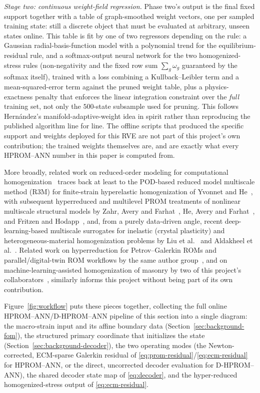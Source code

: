 \documentclass[10pt,a4paper]{article}
\begin{document}
\emph{Stage two: continuous weight-field regression.} Phase two's
output is the final fixed support together with a table of
graph-smoothed weight vectors, one per sampled training state: still
a discrete object that must be evaluated at arbitrary, unseen states
online. This table is fit by one of two regressors depending on the
rule: a Gaussian radial-basis-function model with a polynomial trend
for the equilibrium-residual rule, and a softmax-output neural network
for the two homogenized-stress rules (non-negativity and the fixed row
sum $\sum_g\omega_g$ guaranteed by the softmax itself), trained with a
loss combining a Kullback--Leibler term and a mean-squared-error term
against the pruned weight table, plus a physics-exactness penalty that
enforces the linear integration constraint over the \emph{full}
training set, not only the $500$-state subsample used for pruning. This
follows Hern\'andez's manifold-adaptive-weight idea in spirit rather
than reproducing the published algorithm line for line. The offline
scripts that produced the specific support and weights deployed for
this RVE are not part of this project's own contribution; the trained
weights themselves are, and are exactly what every HPROM--ANN number in
this paper is computed from.

More broadly, related work on reduced-order modeling
for computational
homogenization~\cite{Hernandez2014,Hernandez2020,Miehe1999} traces back
at least to the POD-based reduced model multiscale method (R3M) for
finite-strain hyperelastic homogenization of Yvonnet and
He~\cite{Yvonnet2007}, with subsequent hyperreduced and multilevel PROM
treatments of nonlinear multiscale structural models by Zahr, Avery and
Farhat~\cite{Zahr2017}, He, Avery and Farhat~\cite{He2020}, and Fritzen
and Hodapp~\cite{Fritzen2016}, and, from a purely data-driven angle,
recent deep-learning-based multiscale surrogates for inelastic (crystal
plasticity) and heterogeneous-material homogenization problems by Liu
et al.~\cite{Liu2022} and Aldakheel et al.~\cite{Aldakheel2023}. Related
work on hyperreduction for Petrov--Galerkin ROMs and parallel/digital-twin
ROM workflows by the same author group~\cite{AresDeParga2023,AresDeParga2025},
and on machine-learning-assisted homogenization of masonry by two of
this project's collaborators~\cite{Cornejo2025}, similarly informs this
project without being part of its own contribution.

Figure~\ref{fig:workflow} puts these pieces together, collecting
the full online HPROM--ANN/D-HPROM--ANN pipeline of this section into a
single diagram: the macro-strain input and its affine boundary data
(Section~\ref{sec:background-fom}), the structured primary coordinate that
initializes the state (Section~\ref{sec:background-decoder}), the two
operating modes (the Newton-corrected, ECM-sparse Galerkin residual of
\eqref{eq:prom-residual}/\eqref{eq:ecm-residual} for HPROM--ANN, or the
direct, uncorrected decoder evaluation for D-HPROM--ANN), the shared
decoder state map of \eqref{eq:decoder}, and the hyper-reduced
homogenized-stress output of \eqref{eq:ecm-residual}.
\end{document}
